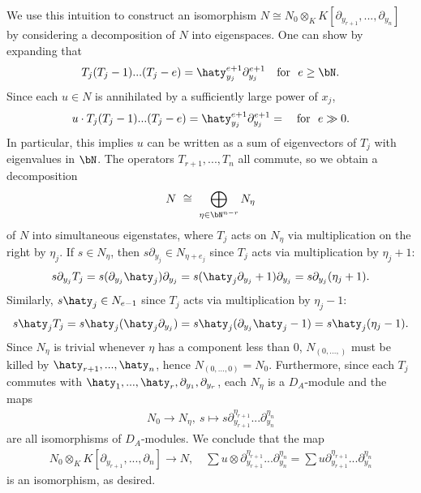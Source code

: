 \begin{prf}
	We use this intuition to construct an isomorphism $N \cong N_0\otimes_K K[\partial_{y_{r+1}},...,\partial_{y_n}]$ by considering a decomposition of $N$ into eigenspaces. One can show by expanding that
	\begin{align*}
		T_j(T_j - 1)...(T_j - e) = \haty_{y_j}^{e+1}\partial_{y_j}^{e+1} \hspace{1em} \text{for } ~ e\geq \bN.
	\end{align*}
	Since each $u \in N$ is annihilated by a sufficiently large power of $x_j$,
	\begin{align*}
		u\cdot T_j(T_j - 1)...(T_j - e) = \haty_{y_j}^{e+1}\partial_{y_j}^{e+1} =  \hspace{1em} \text{for } ~ e\gg 0.
	\end{align*}
	In particular, this implies $u$ can be written as a sum of eigenvectors of $T_j$ with eigenvalues in $\bN$. The operators $T_{r+1},...,T_{n}$ all commute, so we obtain a decomposition
	\begin{align*}
		N ~\cong~ \bigoplus_{\eta \in \bN^{n-r}} N_{\eta}
	\end{align*}
    of $N$ into simultaneous eigenstates, where $T_j$ acts on $N_\eta$ via multiplication on the right by $\eta_j$. If $s \in N_\eta$, then $s\partial_{y_j} \in N_{\eta + e_j}$ since $T_j$ acts via multiplication by $\eta_j + 1$:
	\begin{align*}
		s\partial_{y_j}T_j = s(\partial_{y_j}\haty_j)\partial_{y_j} = s(\haty_j\partial_{y_j} + 1)\partial_{y_j} = s\partial_{y_j}(\eta_j+1).
	\end{align*}
	Similarly, $s\haty_j \in N_{e-1}$ since $T_j$ acts via multiplication by $\eta_j - 1$:
	\begin{align*}
		s\haty_jT_j = s\haty_j(\haty_j\partial_{y_j}) = s\haty_j(\partial_{y_j} \haty_j - 1) = s\haty_j(\eta_j - 1).
	\end{align*}
	Since $N_\eta$ is trivial whenever $\eta$ has a component less than $0$, $N_{(0,...,)}$ must be killed by $\haty_{r+1},...,\haty_{n}$, hence $N_{(0,...,0)} = N_0$. Furthermore, since each $T_j$ commutes with $\haty_1,...,\haty_r,\partial_{y_1},\partial_{y_r}$, each $N_\eta$ is a $D_{A}$-module and the maps
	\begin{align*}
		N_0 \to N_{\eta}, ~ s\mapsto s\partial_{y_{r+1}}^{\eta_{r+1}}...\partial_{y_{n}}^{\eta_n}
	\end{align*}
	are all isomorphisms of $D_{A}$-modules. We conclude that the map
	\begin{align*}
		N_0\otimes_K K[\partial_{y_{r+1}},...,\partial_{n}] \to N, \hspace{1em} \sum u\otimes \partial_{y_{r+1}}^{\eta_{r+1}}...\partial_{y_{n}}^{\eta_n} = \sum u\partial_{y_{r+1}}^{\eta_{r+1}}...\partial_{y_{n}}^{\eta_n}
	\end{align*}
	is an isomorphism, as desired.


\end{prf}
